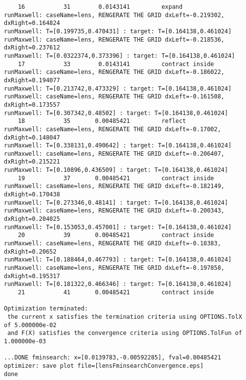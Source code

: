 \documentclass[11pt]{article}
\begin{document}
{\begin{verbatim}
    16           31        0.0143141         expand
runMaxwell: caseName=lens, RENGERATE THE GRID dxLeft=-0.219302, dxRight=0.164824
runMaxwell: T=[0.199735,0.470431] : target: T=[0.164138,0.461024]
runMaxwell: caseName=lens, RENGERATE THE GRID dxLeft=-0.218536, dxRight=0.237612
runMaxwell: T=[0.0322374,0.373396] : target: T=[0.164138,0.461024]
    17           33        0.0143141         contract inside
runMaxwell: caseName=lens, RENGERATE THE GRID dxLeft=-0.186022, dxRight=0.194077
runMaxwell: T=[0.213742,0.473329] : target: T=[0.164138,0.461024]
runMaxwell: caseName=lens, RENGERATE THE GRID dxLeft=-0.161508, dxRight=0.173557
runMaxwell: T=[0.307342,0.48502] : target: T=[0.164138,0.461024]
    18           35       0.00485421         reflect
runMaxwell: caseName=lens, RENGERATE THE GRID dxLeft=-0.17002, dxRight=0.148047
runMaxwell: T=[0.338131,0.490642] : target: T=[0.164138,0.461024]
runMaxwell: caseName=lens, RENGERATE THE GRID dxLeft=-0.206407, dxRight=0.215221
runMaxwell: T=[0.10896,0.436509] : target: T=[0.164138,0.461024]
    19           37       0.00485421         contract inside
runMaxwell: caseName=lens, RENGERATE THE GRID dxLeft=-0.182149, dxRight=0.170438
runMaxwell: T=[0.273346,0.48141] : target: T=[0.164138,0.461024]
runMaxwell: caseName=lens, RENGERATE THE GRID dxLeft=-0.200343, dxRight=0.204025
runMaxwell: T=[0.153053,0.457001] : target: T=[0.164138,0.461024]
    20           39       0.00485421         contract inside
runMaxwell: caseName=lens, RENGERATE THE GRID dxLeft=-0.18383, dxRight=0.20652
runMaxwell: T=[0.188464,0.467793] : target: T=[0.164138,0.461024]
runMaxwell: caseName=lens, RENGERATE THE GRID dxLeft=-0.197858, dxRight=0.195317
runMaxwell: T=[0.181322,0.466346] : target: T=[0.164138,0.461024]
    21           41       0.00485421         contract inside
 
Optimization terminated:
 the current x satisfies the termination criteria using OPTIONS.TolX of 5.000000e-02 
 and F(X) satisfies the convergence criteria using OPTIONS.TolFun of 1.000000e-03 

...DONE fminsearch: x=[0.0139783,-0.00592285], fval=0.00485421
optimizer: save plot file=[lensFminsearchConvergence.eps]
done
\end{verbatim}
}


  
\end{document}
